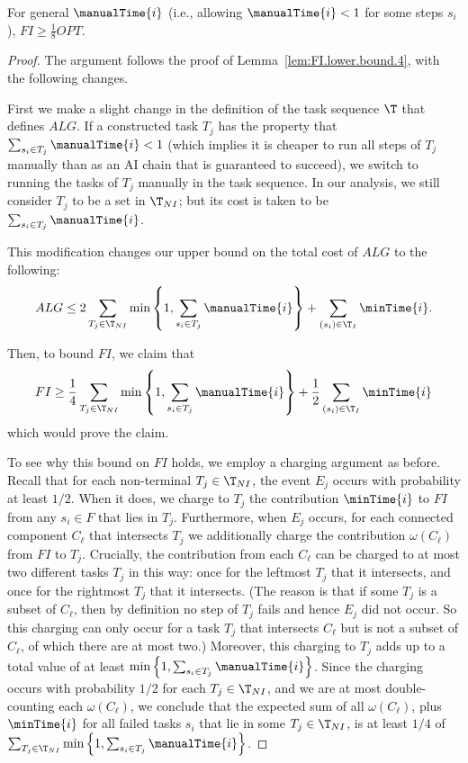 \begin{lem}
\label{lem:FI.lower.bound.8}
    For general $\manualTime{i}$ (i.e., allowing $\manualTime{i} < 1$ for some steps $s_i$), $FI \geq \frac{1}{8}OPT$.
\end{lem}
\begin{proof}
    The argument follows the proof of Lemma~\ref{lem:FI.lower.bound.4}, with the following changes.

    First we make a slight change in the definition of the task sequence $\T$ that defines $ALG$.
    If a constructed task $T_j$ has the property that $\sum_{s_i \in T_j} \manualTime{i} < 1$ (which implies it is cheaper to run all steps of $T_j$ manually than as an AI chain that is guaranteed to succeed), we switch to running the tasks of $T_j$ manually in the task sequence.
    In our analysis, we still consider $T_j$ to be a set in $\T_{NI}$; but its cost is taken to be $\sum_{s_i \in T_j} \manualTime{i}$.

    This modification changes our upper bound on the total cost of $ALG$ to the following:
    \[ ALG \leq 2 \sum_{T_j \in \T_{NI}} \min\left\{1, \sum_{s_i \in T_j} \manualTime{i} \right\} + \sum_{ (s_i) \in \T_I} \minTime{i}. \]

    Then, to bound $FI$, we claim that
    \[ FI \geq \frac{1}{4}\sum_{T_j \in \T_{NI}} \min\left\{1, \sum_{s_i \in T_j} \manualTime{i} \right\} + \frac{1}{2}\sum_{(s_i) \in \T_I} \minTime{i} \]
    which would prove the claim.

    To see why this bound on $FI$ holds, we employ a charging argument as before.
    Recall that for each non-terminal $T_j \in \T_{NI}$, the event $E_j$ occurs with probability at least $1/2$.
    When it does, we charge to $T_j$ the contribution $\minTime{i}$ to $FI$ from any $s_i \in F$ that lies in $T_j$.
    Furthermore, when $E_j$ occurs, for each connected component $C_\ell$ that intersects $T_j$ we additionally charge the contribution $\omega(C_\ell)$ from $FI$ to $T_j$.
    Crucially, the contribution from each $C_\ell$ can be charged to at most two different tasks $T_j$ in this way: once for the leftmost $T_j$ that it intersects, and once for the rightmost $T_j$ that it intersects.
    (The reason is that if some $T_j$ is a subset of $C_\ell$, then by definition no step of $T_j$ fails and hence $E_j$ did not occur.
    So this charging can only occur for a task $T_j$ that intersects $C_\ell$ but is not a subset of $C_\ell$, of which there are at most two.)
    Moreover, this charging to $T_j$ adds up to a  total value of at least $\min\left\{1, \sum_{s_i \in T_j} \manualTime{i} \right\}$.
    Since the charging occurs with probability $1/2$ for each $T_j \in \T_{NI}$, and we are at most double-counting each $\omega(C_\ell)$, we conclude that the expected sum of all $\omega(C_\ell)$, plus $\minTime{i}$ for all failed tasks $s_i$ that lie in some $T_j \in \T_{NI}$, is at least $1/4$ of $\sum_{T_j \in \T_{NI}}\min\left\{1, \sum_{s_i \in T_j} \manualTime{i} \right\}$.


\end{proof}
